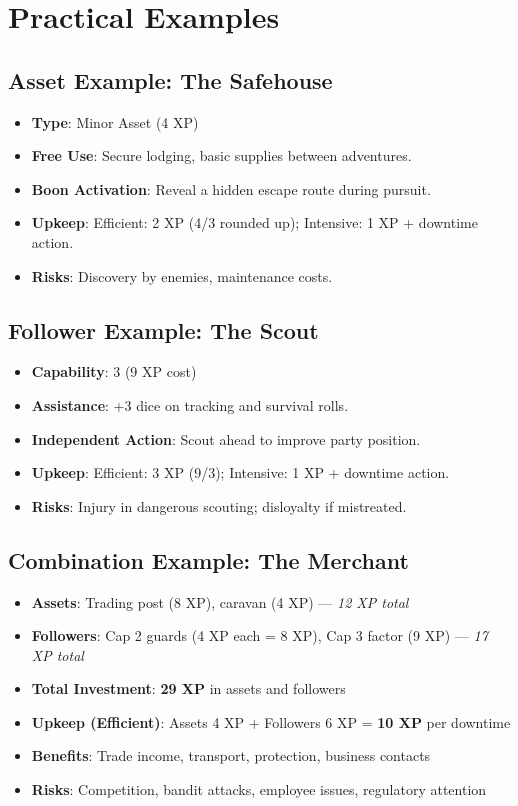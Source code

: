 \section{Practical Examples}
\label{sec:asset-follower-examples}

\subsection*{Asset Example: The Safehouse}
\label{sec:example-safehouse}
\begin{itemize}
\item \textbf{Type}: Minor Asset (4 XP)
\item \textbf{Free Use}: Secure lodging, basic supplies between adventures.
\item \textbf{Boon Activation}: Reveal a hidden escape route during pursuit.
\item \textbf{Upkeep}: Efficient: 2 XP (4/3 rounded up); Intensive: 1 XP + downtime action.
\item \textbf{Risks}: Discovery by enemies, maintenance costs.
\end{itemize}

\subsection*{Follower Example: The Scout}
\label{sec:example-scout}
\begin{itemize}
\item \textbf{Capability}: 3 (9 XP cost)
\item \textbf{Assistance}: +3 dice on tracking and survival rolls.
\item \textbf{Independent Action}: Scout ahead to improve party position.
\item \textbf{Upkeep}: Efficient: 3 XP (9/3); Intensive: 1 XP + downtime action.
\item \textbf{Risks}: Injury in dangerous scouting; disloyalty if mistreated.
\end{itemize}

\subsection*{Combination Example: The Merchant}
\label{sec:example-merchant}
\begin{itemize}
\item \textbf{Assets}: Trading post (8 XP), caravan (4 XP) — \emph{12 XP total}
\item \textbf{Followers}: Cap 2 guards (4 XP each = 8 XP), Cap 3 factor (9 XP) — \emph{17 XP total}
\item \textbf{Total Investment}: \textbf{29 XP} in assets and followers
\item \textbf{Upkeep (Efficient)}: Assets 4 XP + Followers 6 XP = \textbf{10 XP} per downtime
\item \textbf{Benefits}: Trade income, transport, protection, business contacts
\item \textbf{Risks}: Competition, bandit attacks, employee issues, regulatory attention
\end{itemize}

